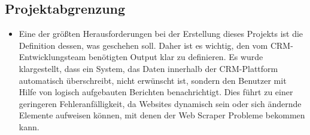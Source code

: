 \subsection{Projektabgrenzung} 
\label{sec:Projektabgrenzung}
\begin{itemize}
	\item Eine der größten Herausforderungen bei der Erstellung dieses Projekts ist die Definition dessen, was geschehen soll.
	Daher ist es wichtig, den vom CRM-Entwicklungsteam benötigten Output klar zu definieren. 
	Es wurde klargestellt, dass ein System, das Daten innerhalb der CRM-Plattform automatisch überschreibt, nicht erwünscht ist, sondern den Benutzer mit Hilfe von logisch aufgebauten Berichten benachrichtigt.
	Dies führt zu einer geringeren Fehleranfälligkeit, da Websites dynamisch sein oder sich ändernde Elemente aufweisen können, mit denen der Web Scraper Probleme bekommen kann.
\end{itemize}
